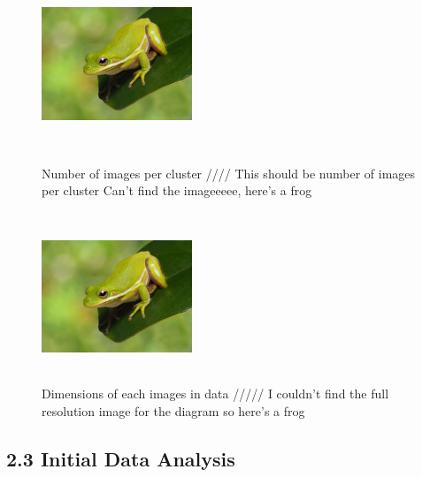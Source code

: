 \documentclass[letterpaper,9pt,twocolumn,twoside,]{pinp}
\begin{document}
\begin{figure}
  \begin{center}
    \includegraphics[width=0.4\textwidth, height=2in]{images/frog.png} 
  \end{center}
  \caption{Number of images per cluster //// This should be number of images per cluster Can't find the imageeeee, here's a frog}\label{fig:image_per_cluster}
  
  \begin{center}
    \includegraphics[width=0.4\textwidth, height=2in]{images/frog.png} 
  \end{center}
  \caption{Dimensions of each images in data ///// I couldn't find the full resolution image for the diagram so here's a frog}\label{fig:dimensions_of_each_image}
\end{figure}

\hypertarget{initial-data-analysis}{%
\subsection{2.3 Initial Data Analysis}\label{initial-data-analysis}}
\end{document}
